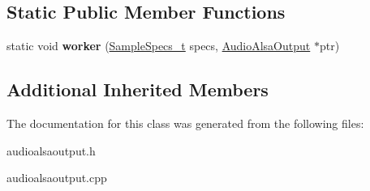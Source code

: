 \subsection*{Static Public Member Functions}
\begin{DoxyCompactItemize}
\item 
\hypertarget{classNl_1_1AudioAlsaOutput_a9e2fcc8a972e3f3c6c218e3cf19bd7de}{}static void {\bfseries worker} (\hyperlink{structNl_1_1SampleSpecs__t}{Sample\+Specs\+\_\+t} specs, \hyperlink{classNl_1_1AudioAlsaOutput}{Audio\+Alsa\+Output} $\ast$ptr)\label{classNl_1_1AudioAlsaOutput_a9e2fcc8a972e3f3c6c218e3cf19bd7de}

\end{DoxyCompactItemize}
\subsection*{Additional Inherited Members}


The documentation for this class was generated from the following files\+:\begin{DoxyCompactItemize}
\item 
audioalsaoutput.\+h\item 
audioalsaoutput.\+cpp\end{DoxyCompactItemize}
